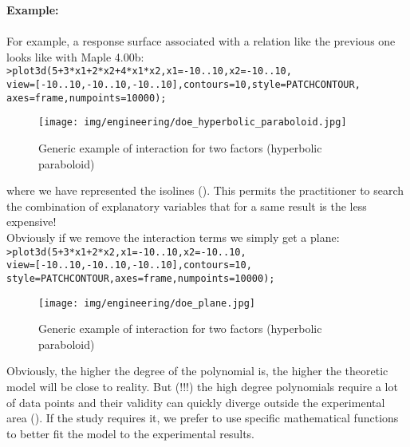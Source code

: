 	\begin{tcolorbox}[colframe=black,colback=white,sharp corners]
	\textbf{{\Large {}}Example:}\\\\
	For example, a response surface associated with a relation like the previous one looks like with Maple 4.00b:\\
	
	\texttt{>plot3d(5+3*x1+2*x2+4*x1*x2,x1=-10..10,x2=-10..10,\\
view=[-10..10,-10..10,-10..10],contours=10,style=PATCHCONTOUR,\\
		axes=frame,numpoints=10000);
		}
	\begin{figure}[H]
		\begin{center}
		\texttt{[image: img/engineering/doe\_hyperbolic\_paraboloid.jpg]}
		\end{center}	
		\caption{Generic example of interaction for two factors (hyperbolic paraboloid)}
	\end{figure}
	where we have represented the isolines (). This permits the practitioner to search the combination of explanatory variables that for a same result is the less expensive!\\

	Obviously if we remove the interaction terms we simply get a plane:\\
	
	\texttt{>plot3d(5+3*x1+2*x2,x1=-10..10,x2=-10..10,\\
	view=[-10..10,-10..10,-10..10],contours=10,\\
	style=PATCHCONTOUR,axes=frame,numpoints=10000);
	}
	\begin{figure}[H]
		\begin{center}
		\texttt{[image: img/engineering/doe\_plane.jpg]}
		\end{center}	
		\caption{Generic example of interaction for two factors (hyperbolic paraboloid)}
	\end{figure}
	\end{tcolorbox}
	Obviously, the higher the degree of the polynomial is, the higher the theoretic model will be close to reality. But (!!!) the high degree polynomials require a lot of data points and their validity can quickly diverge outside the experimental area (). If the study requires it, we prefer to use specific mathematical functions to better fit the model to the experimental results.
	
